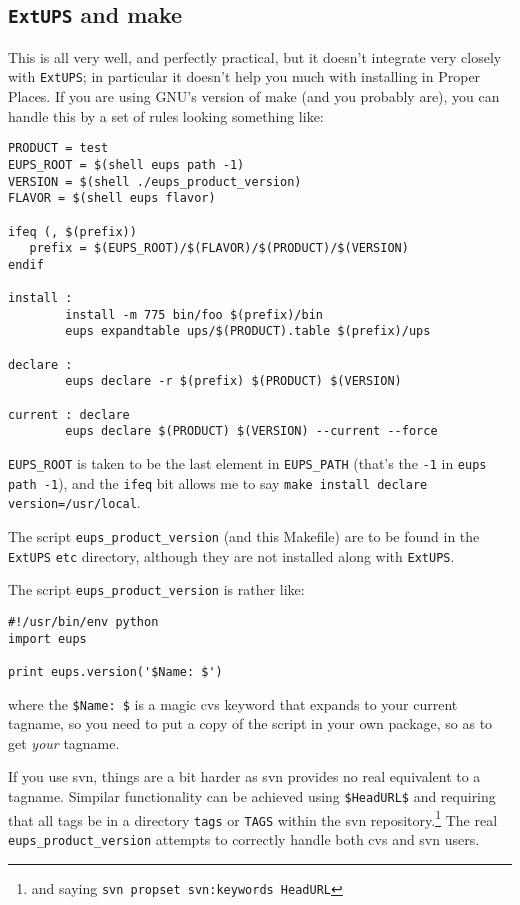 \documentclass{article}
\newcommand{\code}[1]{\texttt{#1}}
\newcommand{\eups}{\code{ExtUPS}}
\begin{document}
\subsection{\eups{} and make}

This is all very well, and perfectly practical, but it doesn't
integrate very closely with \eups{}; in particular it doesn't
help you much with installing in Proper Places. If you are
using GNU's version of make (and you probably are), you can handle
this by a set of rules looking something like:
\begin{verbatim}
PRODUCT = test
EUPS_ROOT = $(shell eups path -1)
VERSION = $(shell ./eups_product_version)
FLAVOR = $(shell eups flavor)

ifeq (, $(prefix))
   prefix = $(EUPS_ROOT)/$(FLAVOR)/$(PRODUCT)/$(VERSION)
endif

install :
        install -m 775 bin/foo $(prefix)/bin
        eups expandtable ups/$(PRODUCT).table $(prefix)/ups

declare :
        eups declare -r $(prefix) $(PRODUCT) $(VERSION)
        
current : declare
        eups declare $(PRODUCT) $(VERSION) --current --force
\end{verbatim}                          %

\code{EUPS\_ROOT} is taken to be the last element in \code{EUPS\_PATH} (that's
the \code{-1} in \code{eups path -1}),
and the \code{ifeq} bit allows me to say \code{make install declare version=/usr/local}.

The script \code{eups\_product\_version} (and this Makefile) are to be found
in the \eups{} \code{etc} directory, although they are not installed along
with \eups{}.

The script \code{eups\_product\_version} is rather like:
\begin{verbatim}
#!/usr/bin/env python
import eups

print eups.version('$Name: $')
\end{verbatim}
where the \code{\$Name:  \$} is a magic cvs keyword that expands to your
current tagname, so you need to put a copy of the script in your own
package, so as to get \emph{your} tagname.

If you use svn, things are a bit harder as svn provides no real
equivalent to a tagname. Simpilar functionality can be achieved using \code{\$HeadURL\$}
and requiring that all tags be in a directory \code{tags}
or \code{TAGS} within the svn repository.\footnote{
  and saying \code{svn propset svn:keywords HeadURL}}
The real \code{eups\_product\_version} attempts to correctly handle both cvs
and svn users.
\end{document}
